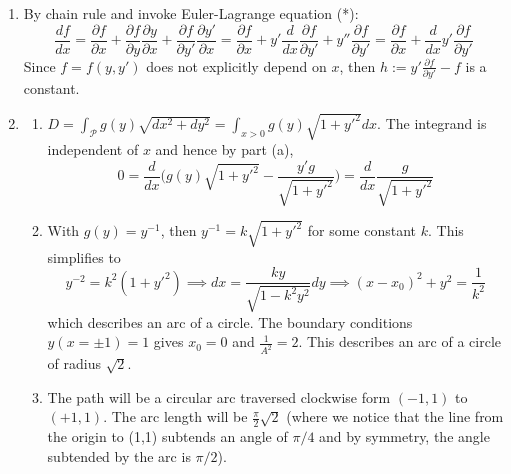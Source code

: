 \documentclass[a4paper]{article}
\begin{document}
\begin{ans}\leavevmode
\begin{enumerate}[label=(\alph*)]
\item By chain rule and invoke Euler-Lagrange equation (*):
$$\frac{df}{dx}=\frac{\partial f}{\partial x}+\frac{\partial f}{\partial y}\frac{\partial y}{\partial x}+\frac{\partial f}{\partial y'}\frac{\partial y'}{\partial x}=\frac{\partial f}{\partial x}+y'\frac{d}{dx}\frac{\partial f}{\partial y'}+y''\frac{\partial f}{\partial y'}=\frac{\partial f}{\partial x}+\frac{d}{dx}y'\frac{\partial f}{\partial y'}$$
Since $f=f(y,y')$ does not explicitly depend on $x$, then $h:=y'\frac{\partial f}{\partial y'}-f$ is a constant.
\item
\begin{enumerate}[label=(\roman*)]
\item
$D=\int_{\mathcal{P}}g(y)\sqrt{dx^2+dy^2}=\int_{x>0}g(y)\sqrt{1+y'^2}dx$. The integrand is independent of $x$ and hence by part (a),
$$0=\frac{d}{dx}\bigg(g(y)\sqrt{1+y'^2}-\frac{y'g}{\sqrt{1+y'^2}}\bigg)=\frac{d}{dx}\frac{g}{\sqrt{1+y'^2}}$$
\item With $g(y)=y^{-1}$, then $y^{-1}=k\sqrt{1+y'^2}$ for some constant $k$. This simplifies to
$$y^{-2}=k^2(1+y'^2)\implies dx=\frac{ky}{\sqrt{1-k^2y^2}}dy\implies(x-x_0)^2+y^2=\frac{1}{k^2}$$
which describes an arc of a circle. The boundary conditions $y(x=\pm 1)=1$ gives $x_0=0$ and $\frac{1}{A^2}=2$. This describes an arc of a circle of radius $\sqrt{2}$.
\item The path will be a circular arc traversed clockwise form $(-1,1)$ to $(+1,1)$. The arc length will be $\frac{\pi}{2}\sqrt{2}$ (where we notice that the line from the origin to (1,1) subtends an angle of $\pi/4$ and by symmetry, the angle subtended by the arc is $\pi/2$).
\end{enumerate}
\end{enumerate}
\end{ans}
\newpage
\end{document}
